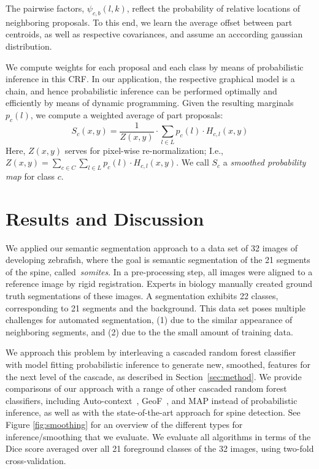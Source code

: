 \documentclass[10pt,twocolumn,letterpaper]{article}
\begin{document}
The pairwise factors, $\psi_{c,b}(l,k)$, reflect the probability of relative locations of neighboring proposals. To this end, we learn the average offset between part centroids, as well as respective covariances, and assume an acccording gaussian distribution. 

We compute weights for each proposal and each class by means of probabilistic inference in this CRF. In our application, the respective graphical model is a chain, and hence probabilistic inference can be performed optimally and efficiently by means of dynamic programming. 
%
Given the resulting marginals $p_c(l)$, we compute a weighted average of part proposals: 
\begin{equation}
 S_c(x,y) = \frac{1}{Z(x,y)} \cdot \sum_{l\in L} p_c(l)\cdot H_{c,l}(x,y) 
\label{eq:weighting}
\end{equation}
%
Here, $Z(x,y)$ serves for pixel-wise re-normalization; I.e., $Z(x,y)=\sum_{c\in C}\sum_{l\in L} p_c(l)\cdot H_{c,l}(x,y)$.
%
We call $S_c$ a \emph{smoothed probability map} for class $c$. 

\section{Results and Discussion}

We applied our semantic segmentation approach to a data set of 32 images of developing zebrafish, where the goal is semantic segmentation of the 21 segments of the spine, called~\emph{somites}. In a pre-processing step, all images were aligned to a reference image by rigid registration. Experts in biology manually created ground truth segmentations of these images. A segmentation exhibits 22 classes, corresponding to 21 segments and the background. This data set poses multiple challenges for automated segmentation, (1) due to the similar appearance of neighboring segments, and (2) due to the the small amount of training data.

We approach this problem by interleaving a cascaded random forest classifier with model fitting probabilistic inference to generate new, smoothed, features for the next level of the cascade, as described in Section~\ref{sec:method}. 
%
We provide comparisons of our approach with a range of other cascaded random forest classifiers, including Auto-context~\cite{AutoContext2008}, GeoF~\cite{GeoForests2013}, and MAP instead of probabilistic inference, as well as with the state-of-the-art approach for spine detection.  See Figure \ref{fig:smoothing} for an overview of the different types for inference/smoothing that we evaluate.  We evaluate all algorithms in terms of the Dice score averaged over all 21 foreground classes of the 32 images, using two-fold cross-validation.
\end{document}
